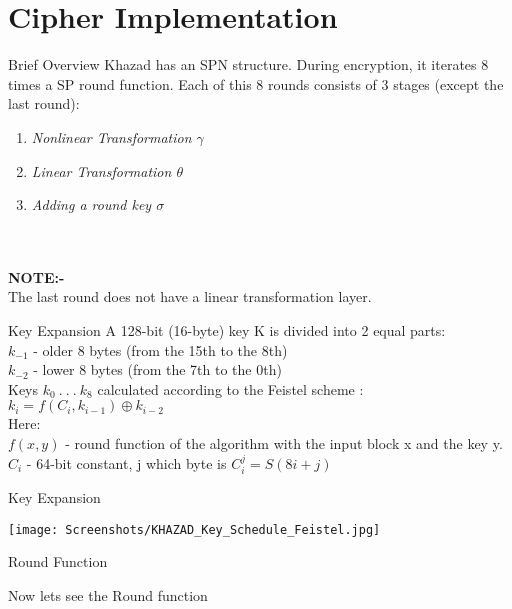 \section{Cipher Implementation}

\begin{frame}{Brief Overview}
Khazad has an SPN structure. During encryption, it iterates 8 times a SP round function. Each of this 8 rounds consists of 3 stages (except the last round):\\ 
\begin{enumerate}
        \item \textit{Nonlinear Transformation $\gamma$} 
        \item \textit{Linear Transformation $\theta$ }
        \item \textit{Adding a round key $\sigma$}
\end{enumerate}\\\\
\textbf{NOTE:-}\\
The last round does not have a linear transformation layer. 
\end{frame}

\begin{frame}{Key Expansion}
A 128-bit (16-byte) key K is divided into 2 equal parts:\\
$k_{-1}$ - older 8 bytes (from the 15th to the 8th)\\
$k_{-2}$ - lower 8 bytes (from the 7th to the 0th)\\
Keys $k_{0} \ .\ .\ . \ k_{8}$ calculated according to the Feistel scheme : \\
 $k_{i} = f(C_{i}, k_{i-1}) \oplus k_{i-2}$ \\
Here:\\
$f(x, y)$ - round function of the algorithm with the input block x and the key y.\\
$C_{i}$ - 64-bit constant, j which byte is $C_{i}^{j} = S (8i + j)$ \\
\end{frame}

\begin{frame}{Key Expansion}
\begin{center}
    \texttt{[image: Screenshots/KHAZAD\_Key\_Schedule\_Feistel.jpg]}
\end{center}
\end{frame}

\begin{frame}{Round Function}
    \begin{center}
    {\huge {Now lets see the Round function}}
    \end{center}
\end{frame}

